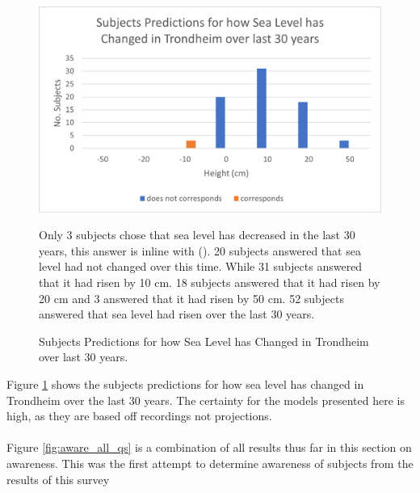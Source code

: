 \begin{figure}[H]
    \centering
    \includegraphics{fig_results/slr-past.png}
    \caption{Subjects Predictions for how Sea Level has Changed in Trondheim over last 30 years.}{ Only 3 subjects chose that sea level has decreased in the last 30 years, this answer is inline with (\cite{kartverket_se_2021}). 20 subjects answered that sea level had not changed over this time. While 31 subjects answered that it had risen by 10 cm. 18 subjects answered that it had risen by 20 cm and 3 answered that it had risen by 50 cm. 52 subjects answered that sea level had risen over the last 30 years. }
    \label{fig:slr_past}
\end{figure}

Figure \ref{fig:slr_past} shows the subjects predictions for how sea level has changed in Trondheim over the last 30 years. The certainty for the models presented here is high, as they are based off recordings not projections. 
\paragraph{}

Figure \ref{fig:aware_all_qs} is a combination of all results thus far in this section on awareness. This was the first attempt to determine awareness of subjects from the results of this survey

